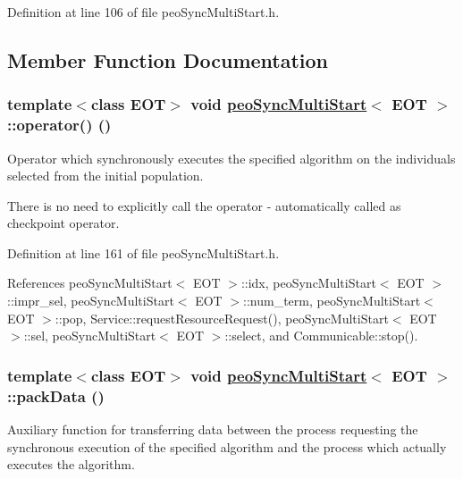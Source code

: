 Definition at line 106 of file peo\-Sync\-Multi\-Start.h.

\subsection{Member Function Documentation}
\hypertarget{classpeoSyncMultiStart_76385b33fe514f91cb83f0fbecbeb3c2}{
\subsubsection[operator()]{\setlength{\rightskip}{0pt plus 5cm}template$<$class EOT$>$ void \hyperlink{classpeoSyncMultiStart}{peo\-Sync\-Multi\-Start}$<$ EOT $>$::operator() ()}}
\label{classpeoSyncMultiStart_76385b33fe514f91cb83f0fbecbeb3c2}


Operator which synchronously executes the specified algorithm on the individuals selected from the initial population. 

There is no need to explicitly call the operator - automatically called as checkpoint operator. 

Definition at line 161 of file peo\-Sync\-Multi\-Start.h.

References peo\-Sync\-Multi\-Start$<$ EOT $>$::idx, peo\-Sync\-Multi\-Start$<$ EOT $>$::impr\_\-sel, peo\-Sync\-Multi\-Start$<$ EOT $>$::num\_\-term, peo\-Sync\-Multi\-Start$<$ EOT $>$::pop, Service::request\-Resource\-Request(), peo\-Sync\-Multi\-Start$<$ EOT $>$::sel, peo\-Sync\-Multi\-Start$<$ EOT $>$::select, and Communicable::stop().\hypertarget{classpeoSyncMultiStart_8becfab1922b64708dca5a53e2932a5a}{
\subsubsection[packData]{\setlength{\rightskip}{0pt plus 5cm}template$<$class EOT$>$ void \hyperlink{classpeoSyncMultiStart}{peo\-Sync\-Multi\-Start}$<$ EOT $>$::pack\-Data ()}}
\label{classpeoSyncMultiStart_8becfab1922b64708dca5a53e2932a5a}


Auxiliary function for transferring data between the process requesting the synchronous execution of the specified algorithm and the process which actually executes the algorithm. 

